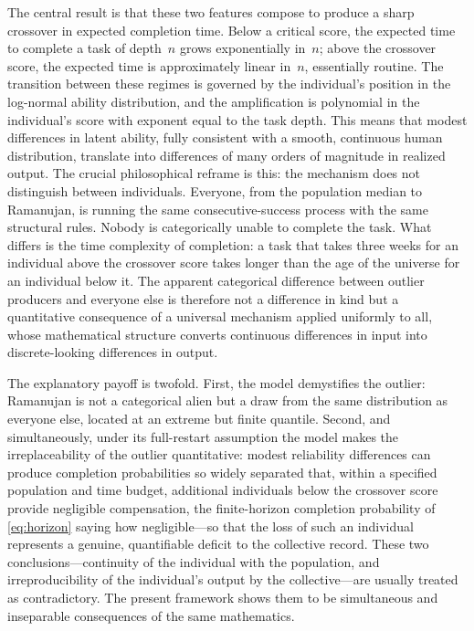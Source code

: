 \documentclass{article}
\begin{document}
The central result is that these two features compose to produce a sharp
{crossover} in expected completion time. Below a critical
score, the expected time to complete a task of depth~$n$ grows
exponentially in~$n$; above the crossover score, the expected time is
approximately linear in~$n$, essentially routine. The transition between these
regimes is governed by the individual's position in the log-normal
ability distribution, and the amplification is polynomial in the
individual's score with exponent equal to the task depth. This means
that modest differences in latent ability, fully
consistent with a smooth, continuous human distribution, translate into
differences of many orders of magnitude in realized output.
The crucial philosophical reframe is this: the mechanism does not
distinguish between individuals. Everyone, from the population median
to Ramanujan, is running the same consecutive-success process with the
same structural rules. Nobody is categorically unable to complete the
task. What differs is the {time complexity} of completion: a task
that takes three weeks for an individual above the crossover score takes
longer than the age of the universe for an individual below it. The
apparent categorical difference between outlier producers and everyone
else is therefore not a difference in {kind} but a quantitative
consequence of a universal mechanism applied uniformly to all, whose
mathematical structure converts continuous differences in input into
discrete-looking differences in output.

The explanatory payoff is twofold. First, the model {demystifies}
the outlier: Ramanujan is not a categorical alien but a draw from the
same distribution as everyone else, located at an extreme but finite
quantile.
Second, and simultaneously, under its full-restart assumption the model {makes the irreplaceability} of the outlier quantitative: modest reliability differences can produce completion probabilities so widely separated that, within a specified population and time budget, additional individuals below the crossover score provide negligible compensation, the finite-horizon completion probability of \eqref{eq:horizon} saying how negligible---so that the loss of such an
individual represents a genuine, quantifiable deficit to the collective
record. These two conclusions---continuity of the individual with the
population, and irreproducibility of the individual's output by the
collective---are usually treated as contradictory. The present framework
shows them to be simultaneous and inseparable consequences of the same
mathematics.
\end{document}
